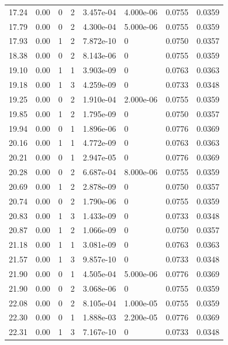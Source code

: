 \documentclass[preview]{standalone}
\begin{document}
{{{\begin{tabular}{L{1.2cm}C{1.2cm} C{0.3cm}C{0.5cm} C{1.4cm}C{1.4cm} C{1.4cm}C{1.4cm}}
  17.24  &  0.00  & 0     &  2 &  3.457e-04  & 4.000e-06  & 0.0755 &  0.0359   \\ 
  17.79  &  0.00  & 0     &  2 &  4.300e-04  & 5.000e-06  & 0.0755 &  0.0359   \\ 
  17.93  &  0.00  & 1     &  2 &  7.872e-10  & 0  & 0.0750 &  0.0357   \\ 
  18.38  &  0.00  & 0     &  2 &  8.143e-06  & 0  & 0.0755 &  0.0359   \\ 
  19.10  &  0.00  & 1     &  1 &  3.903e-09  & 0  & 0.0763 &  0.0363   \\ 
  19.18  &  0.00  & 1     &  3 &  4.259e-09  & 0  & 0.0733 &  0.0348   \\ 
  19.25  &  0.00  & 0     &  2 &  1.910e-04  & 2.000e-06  & 0.0755 &  0.0359   \\ 
  19.85  &  0.00  & 1     &  2 &  1.795e-09  & 0  & 0.0750 &  0.0357   \\ 
  19.94  &  0.00  & 0     &  1 &  1.896e-06  & 0  & 0.0776 &  0.0369   \\ 
  20.16  &  0.00  & 1     &  1 &  4.772e-09  & 0  & 0.0763 &  0.0363   \\ 
  20.21  &  0.00  & 0     &  1 &  2.947e-05  & 0  & 0.0776 &  0.0369   \\ 
  20.28  &  0.00  & 0     &  2 &  6.687e-04  & 8.000e-06  & 0.0755 &  0.0359   \\ 
  20.69  &  0.00  & 1     &  2 &  2.878e-09  & 0  & 0.0750 &  0.0357   \\ 
  20.74  &  0.00  & 0     &  2 &  1.790e-06  & 0  & 0.0755 &  0.0359   \\ 
  20.83  &  0.00  & 1     &  3 &  1.433e-09  & 0  & 0.0733 &  0.0348   \\ 
  20.87  &  0.00  & 1     &  2 &  1.066e-09  & 0  & 0.0750 &  0.0357   \\ 
  21.18  &  0.00  & 1     &  1 &  3.081e-09  & 0  & 0.0763 &  0.0363   \\ 
  21.57  &  0.00  & 1     &  3 &  9.857e-10  & 0  & 0.0733 &  0.0348   \\ 
  21.90  &  0.00  & 0     &  1 &  4.505e-04  & 5.000e-06  & 0.0776 &  0.0369   \\ 
  21.90  &  0.00  & 0     &  2 &  3.068e-06  & 0  & 0.0755 &  0.0359   \\ 
  22.08  &  0.00  & 0     &  2 &  8.105e-04  & 1.000e-05  & 0.0755 &  0.0359   \\ 
  22.30  &  0.00  & 0     &  1 &  1.888e-03  & 2.200e-05  & 0.0776 &  0.0369   \\ 
  22.31  &  0.00  & 1     &  3 &  7.167e-10  & 0  & 0.0733 &  0.0348   \\ 

\end{tabular}}}}
\end{document}
